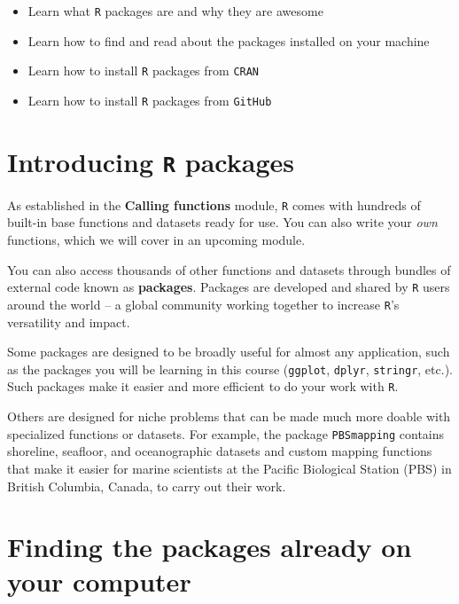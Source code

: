 \documentclass[
]{book}
\providecommand{\tightlist}{%
  \setlength{\itemsep}{0pt}\setlength{\parskip}{0pt}}
\begin{document}
\begin{itemize}
\tightlist
\item
  Learn what \texttt{R} packages are and why they are awesome
\item
  Learn how to find and read about the packages installed on your machine
\item
  Learn how to install \texttt{R} packages from \texttt{CRAN}
\item
  Learn how to install \texttt{R} packages from \texttt{GitHub}
\end{itemize}

\hypertarget{introducing-r-packages}{%
\section*{\texorpdfstring{Introducing \texttt{R} packages}{Introducing R packages}}\label{introducing-r-packages}}

As established in the \textbf{Calling functions} module, \texttt{R} comes with hundreds of built-in base functions and datasets ready for use. You can also write your \emph{own} functions, which we will cover in an upcoming module.

You can also access thousands of other functions and datasets through bundles of external code known as \textbf{packages}. Packages are developed and shared by \texttt{R} users around the world -- a global community working together to increase \texttt{R}'s versatility and impact.

Some packages are designed to be broadly useful for almost any application, such as the packages you will be learning in this course (\texttt{ggplot}, \texttt{dplyr}, \texttt{stringr}, etc.). Such packages make it easier and more efficient to do your work with \texttt{R}.

Others are designed for niche problems that can be made much more doable with specialized functions or datasets. For example, the package \texttt{PBSmapping} contains shoreline, seafloor, and oceanographic datasets and custom mapping functions that make it easier for marine scientists at the Pacific Biological Station (PBS) in British Columbia, Canada, to carry out their work.

\hypertarget{finding-the-packages-already-on-your-computer}{%
\section*{Finding the packages already on your computer}\label{finding-the-packages-already-on-your-computer}}
\end{document}
